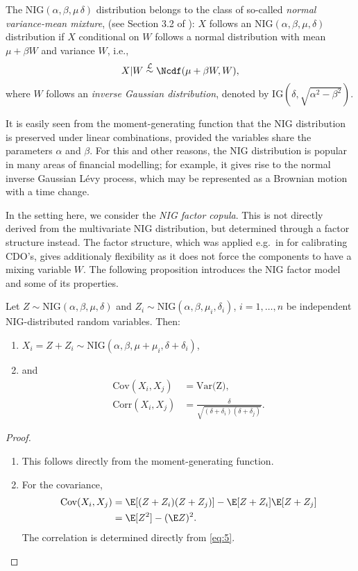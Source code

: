The $\text{NIG}(\alpha, \beta, \mu\, \delta)$ distribution belongs to
the class of so-called {\em normal
variance-mean mixture},  (see Section 3.2 of
\citep{McNeil2005}): $X$ follows an
$\text{NIG}(\alpha,\beta,\mu,\delta)$ distribution if $X$ conditional
on $W$ follows a normal distribution with mean $\mu+\beta W$ and
variance $W$, i.e., 
\begin{equation*}
  X|W\stackrel{\mathcal L}\sim \Ncdf(\mu + \beta W, W),
\end{equation*}
where $W$ follows an {\em inverse Gaussian distribution}, denoted by
$\text{IG}(\delta, \sqrt{\alpha^2-\beta^2})$.

It is easily seen from the moment-generating function that the NIG distribution is preserved under linear combinations, provided
the variables share the parameters $\alpha$ and $\beta$. For this
and other reasons, the NIG distribution is popular in many areas of
financial modelling; for example, it gives rise 
to the normal inverse Gaussian L\'evy process, which may be represented
as a Brownian motion with a time change.

In the setting here, we consider the {\em NIG factor copula}. This is
not directly derived from the multivariate NIG distribution, but
determined through a factor structure instead. The factor structure,
which 
was applied e.g.\ in \citep{Kalemanova2007} for calibrating CDO's,
gives additionaly flexibility as it does not force the components to
have a mixing variable $W$.
The following proposition introduces the NIG factor model and some of
its properties.
\begin{proposition}
  \label{prop:NIG}
  Let $Z\sim \text{NIG}(\alpha, \beta, \mu, \delta)$ and
  $Z_i\sim \text{NIG}(\alpha, \beta, \mu_i, \delta_i)$,
  $i=1,\ldots, n$ be independent NIG-distributed random
  variables. Then:
  \begin{enumerate}
  \item  $X_i = Z + Z_i\sim \text{NIG}(\alpha,\beta,\mu+\mu_i,
  \delta+\delta_i)$,
\item and 
  \begin{align}
    \text{Cov}(X_i,X_j) &= \text{Var(Z)},\nonumber\\
    \text{Corr}(X_i,X_j) &= \frac{\delta}{\sqrt{(\delta+\delta_i)
                           (\delta+\delta_j)}}. \label{eq:6}
  \end{align}
\end{enumerate}
\end{proposition}
\begin{proof}
  \begin{enumerate}
  \item This follows directly from the moment-generating function. 
  \item For the covariance,
    \begin{align*}
      \text{Cov}(X_i,X_j)
      &= \E[(Z+Z_i) (Z+Z_j)] - \E[Z+Z_i] \E[Z+Z_j]\\
      &= \E[Z^2] -(\E Z)^2.
    \end{align*}
    The correlation is determined directly from \eqref{eq:5}. 
  \end{enumerate}
\end{proof}

